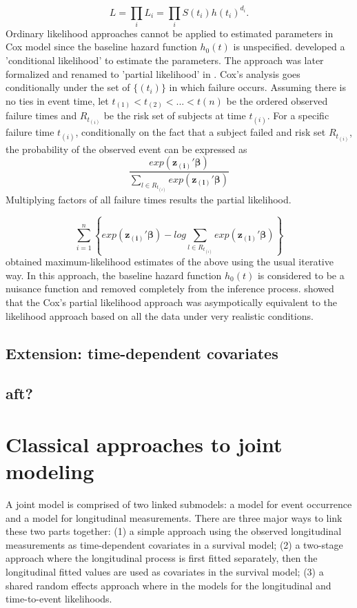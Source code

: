 \documentclass{article}
\numberwithin{equation}{section}
\begin{document}
 \begin{equation}
 L=\prod_{i}L_i=\prod_{i}S(t_i)h(t_i)^{d_i}.
 \end{equation}
Ordinary likelihood approaches cannot be applied to estimated parameters in Cox model since the baseline hazard function $h_0(t)$ is unspecified. \cite{cox1972regression} developed a 'conditional likelihood' to estimate the parameters. The approach was later  formalized and renamed to 'partial likelihood' in \cite{cox1975partial}. Cox's analysis goes conditionally under the set of $\{(t_{i})\}$ in which failure occurs. Assuming there is no ties in event time, let $t_{(1)}<t_{(2)}<...<t{(n)}$ be the ordered observed failure times and $R_{t_{(i)}}$ be the risk set of subjects at time $t_{(i)}$. For a specific failure time $t_{(i)}$, conditionally on the fact that a subject failed and risk set $R_{t_{(i)}}$, the probability of the observed event can be expressed as
\begin{equation}
\frac{exp(\bm{z_{(i)}'}\bm{\beta})}{\sum\limits_{l \in R_{t_{(i)}}} exp(\bm{z_{(l)}'}\bm{\beta})}
\end{equation}
Multiplying factors of all failure times results the partial likelihood. 

\begin{equation}
\sum\limits_{i=1}^n \left\{exp(\bm{z_{(i)}'}\bm{\beta}) - log {\sum\limits_{l \in R_{t_{(i)}}} exp(\bm{z_{(l)}'}\bm{\beta})}\right\}
\end{equation}
\cite{cox1972regression} obtained maximum-likelihood estimates of the above using the usual iterative way. In this approach, the baseline hazard function $h_0(t)$ is considered to be a nuisance function and removed completely from the inference process. \cite{efron1977efficiency} showed that the Cox's partial likelihood approach was asympotically equivalent to the likelihood approach based on all the data under very realistic conditions.

\subsection{Extension: time-dependent covariates}

\subsection{aft?}


\section{Classical approaches to joint modeling}
A joint model is comprised of two linked submodels: a model for event occurrence and a model for longitudinal measurements. There are three major ways to link these two parts together: (1) a simple approach using the observed longitudinal measurements as time-dependent covariates in a survival model; (2) a two-stage approach where the longitudinal process is first fitted separately, then the longitudinal fitted values are used as covariates in the survival model; (3) a shared random effects approach where in the models for the
longitudinal and time-to-event likelihoods.
\end{document}
